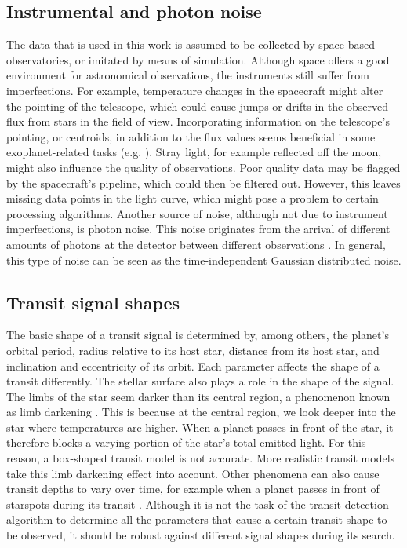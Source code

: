 \subsection{Instrumental and photon noise}
The data that is used in this work is assumed to be collected by space-based observatories, or imitated by means of simulation. Although space offers a good environment for astronomical observations, the instruments still suffer from imperfections. For example, temperature changes in the spacecraft might alter the pointing of the telescope, which could cause jumps or drifts in the observed flux from stars in the field of view. Incorporating information on the telescope’s pointing, or centroids, in addition to the flux values seems beneficial in some exoplanet-related tasks (e.g. \citealp{osborn2020rapid, morvan2020detrending}).  Stray light, for example reflected off the moon, might also influence the quality of observations. Poor quality data may be flagged by the spacecraft’s pipeline, which could then be filtered out. However, this leaves missing data points in the light curve, which might pose a problem to certain processing algorithms. 
Another source of noise, although not due to instrument imperfections, is photon noise. This noise originates from the arrival of different amounts of photons at the detector between different observations \citep{hasinoff2014photon}. In general, this type of noise can be seen as the time-independent Gaussian distributed noise.

\subsection{Transit signal shapes}
\label{sec:transit_shapes}

The basic shape of a transit signal is determined by, among others, the planet’s orbital period, radius relative to its host star, distance from its host star, and inclination and eccentricity of its orbit. Each parameter affects the shape of a transit differently. The stellar surface also plays a role in the shape of the signal. The limbs of the star seem darker than its central region, a phenomenon known as limb darkening \citep{claret2000new}. This is because at the central region, we look deeper into the star where temperatures are higher. When a planet passes in front of the star, it therefore blocks a varying portion of the star’s total emitted light. For this reason, a box-shaped transit model is not accurate. More realistic transit models take this limb darkening effect into account. Other phenomena can also cause transit depths to vary over time, for example when a planet passes in front of starspots during its transit \citep{llama2015transiting}. Although it is not the task of the transit detection algorithm to determine all the parameters that cause a certain transit shape to be observed, it should be robust against different signal shapes during its search.

